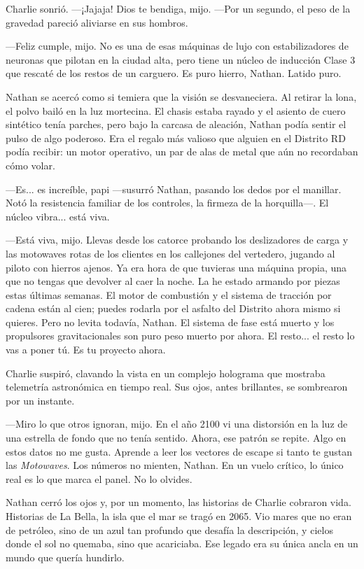 \documentclass[11pt,twoside]{book}
\begin{document}
Charlie sonrió. ---¡Jajaja! Dios te bendiga, mijo. ---Por un segundo, el peso de la gravedad pareció aliviarse en sus hombros.

---Feliz cumple, mijo. No es una de esas máquinas de lujo con estabilizadores de neuronas que pilotan en la ciudad alta, pero tiene un núcleo de inducción Clase 3 que rescaté de los restos de un carguero. Es puro hierro, Nathan. Latido puro.

Nathan se acercó como si temiera que la visión se desvaneciera. Al retirar la lona, el polvo bailó en la luz mortecina. El chasis estaba rayado y el asiento de cuero sintético tenía parches, pero bajo la carcasa de aleación, Nathan podía sentir el pulso de algo poderoso. Era el regalo más valioso que alguien en el Distrito RD podía recibir: un motor operativo, un par de alas de metal que aún no recordaban cómo volar.

---Es... es increíble, papi ---susurró Nathan, pasando los dedos por el manillar. Notó la resistencia familiar de los controles, la firmeza de la horquilla---. El núcleo vibra... está viva.

---Está viva, mijo. Llevas desde los catorce probando los deslizadores de carga y las motowaves rotas de los clientes en los callejones del vertedero, jugando al piloto con hierros ajenos. Ya era hora de que tuvieras una máquina propia, una que no tengas que devolver al caer la noche. La he estado armando por piezas estas últimas semanas. El motor de combustión y el sistema de tracción por cadena están al cien; puedes rodarla por el asfalto del Distrito ahora mismo si quieres. Pero no levita todavía, Nathan. El sistema de fase está muerto y los propulsores gravitacionales son puro peso muerto por ahora. El resto... el resto lo vas a poner tú. Es tu proyecto ahora.

Charlie suspiró, clavando la vista en un complejo holograma que mostraba telemetría astronómica en tiempo real. Sus ojos, antes brillantes, se sombrearon por un instante.

---Miro lo que otros ignoran, mijo. En el año 2100 vi una distorsión en la luz de una estrella de fondo que no tenía sentido. Ahora, ese patrón se repite. Algo en estos datos no me gusta. Aprende a leer los vectores de escape si tanto te gustan las \textit{Motowaves}. Los números no mienten, Nathan. En un vuelo crítico, lo único real es lo que marca el panel. No lo olvides.

Nathan cerró los ojos y, por un momento, las historias de Charlie cobraron vida. Historias de La Bella, la isla que el mar se tragó en 2065. Vio mares que no eran de petróleo, sino de un azul tan profundo que desafía la descripción, y cielos donde el sol no quemaba, sino que acariciaba. Ese legado era su única ancla en un mundo que quería hundirlo.
\end{document}
